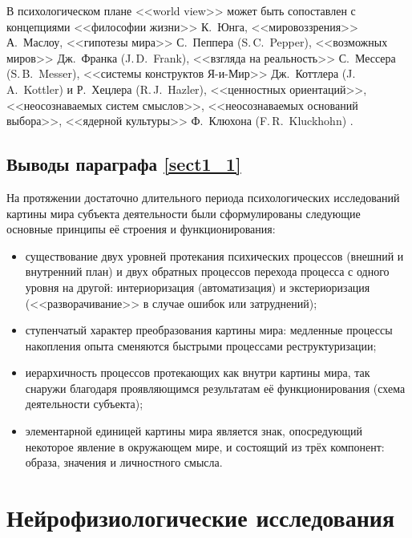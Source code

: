 В психологическом плане <<world view>> может быть сопоставлен с концепциями <<философии жизни>> К.~Юнга, <<мировоззрения>> А.~Маслоу, <<гипотезы мира>> С.~Пеппера (S.\,C.~Pepper), <<возможных миров>> Дж.~Франка (J.\,D.~Frank), <<взгляда на реальность>> С.~Мессера (S.\,B.~Messer), <<системы конструктов Я-и-Мир>> Дж.~Коттлера (J.\,A.~Kottler) и Р.~Хецлера (R.\,J.~Hazler), <<ценностных ориентаций>>, <<неосознаваемых систем смыслов>>, <<неосознаваемых оснований выбора>>, <<ядерной культуры>> Ф.~Клюхона (F.\,R.~Kluckhohn) \cite{Koltko-Rivera2004}. 

\subsection{Выводы параграфа \ref{sect1_1}}

На протяжении достаточно длительного периода психологических исследований картины мира субъекта деятельности были сформулированы следующие основные принципы её строения и функционирования:
\begin{itemize}
	\item существование двух уровней протекания психических процессов (внешний и внутренний план) и двух обратных процессов перехода процесса с одного уровня на другой: интериоризация (автоматизация) и экстериоризация (<<разворачивание>> в случае ошибок или затруднений);
	\item ступенчатый характер преобразования картины мира: медленные процессы накопления опыта сменяются быстрыми процессами реструктуризации;
	\item иерархичность процессов протекающих как внутри картины мира, так снаружи благодаря проявляющимся результатам её функционирования (схема деятельности субъекта);
	\item элементарной единицей картины мира является знак, опосредующий некоторое явление в окружающем мире, и состоящий из трёх компонент: образа, значения и личностного смысла.
\end{itemize}

\section{Нейрофизиологические исследования} \label{sect1_2}

